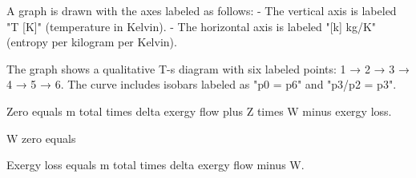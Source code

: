 A graph is drawn with the axes labeled as follows:  
- The vertical axis is labeled "T [K]" (temperature in Kelvin).  
- The horizontal axis is labeled "[k] kg/K" (entropy per kilogram per Kelvin).  

The graph shows a qualitative T-s diagram with six labeled points:  
1 → 2 → 3 → 4 → 5 → 6.  
The curve includes isobars labeled as "p0 = p6" and "p3/p2 = p3".

Zero equals m total times delta exergy flow plus Z times W minus exergy loss.  

W zero equals  

Exergy loss equals m total times delta exergy flow minus W.